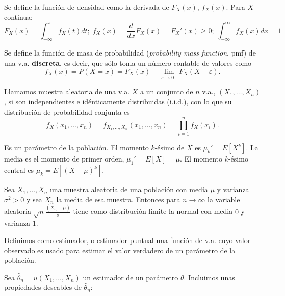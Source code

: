 \begin{definicion}
	Se define la función de densidad como la derivada de 
$F_X(x)$, $f_X(x)$. Para $X$ continua:
	\[ 
		F_X(x) = \int_{-\infty}^x f_X(t) dt; \;
		f_X(x) = \frac{d}{dx}F_X(x) = F_X'(x) \geq 0; \;
		\int_{-\infty}^{\infty} f_X(x) dx = 1 
	\]
\end{definicion}
	
\begin{definicion}
	Se define la función de masa de probabilidad  
(\textit{probability mass function}, pmf) de una v.a. 
\textbf{discreta}, es decir, que sólo toma un número contable 
de valores como
	\[ 
		f_X(x) = P(X=x) = 
		F_X(x) - 
			\lim_{\varepsilon \rightarrow 0^+} 
				F_X(X-\varepsilon).
	\]
\end{definicion}

\begin{definicion}
	Llamamos muestra aleatoria de una v.a. $X$ a un conjunto 
de $n$ v.a., $(X_1, \dots, X_n)$, si son independientes e 
idénticamente distribuidas (i.i.d.), con lo que su 
distribución de probabilidad conjunta es
	\[ 
		f_{X}(x_1, \dots, x_n) =
		f_{X_1, \dots, X_n}(x_1, \dots, x_n) =
		\prod\limits_{i=1}^n f_X(x_i).
	\]
\end{definicion}
	
\begin{definicion}[Momento]
	Es un parámetro de la población. El momento $k$-ésimo de 
$X$ es $\mu_k' = E[X^k]$. La media es el momento de primer 
orden, $\mu_1' = E[X] = \mu$. El momento $k$-ésimo central es 
$\mu_k = E[(X - \mu)^k]$.
\end{definicion}

\begin{teorema}
	Sea $X_1, \dots, X_n$ una muestra aleatoria de una 
población con media $\mu$ y varianza $\sigma^2 > 0$ y sea 
$\bar{X}_n$ la media de esa muestra. Entonces para $n 
\rightarrow \infty$ la variable aleatoria $\sqrt{n}
\frac{(\bar{X}_n - \mu)}{\sigma}$ tiene como distribución 
límite la normal con media $0$ y varianza $1$.
\end{teorema}

\begin{definicion}[Estimador]
	Definimos como estimador, o estimador puntual una función 
de v.a. cuyo valor observado es usado para estimar el valor 
verdadero de un parámetro de la población. 
\end{definicion}

	Sea $\hat{\theta}_n = u(X_1, \dots, X_n)$ un estimador de 
un parámetro $\theta$. Incluimos unas propiedades deseables 
de $\hat{\theta}_n$:
	
